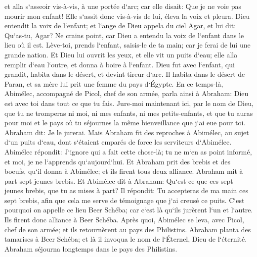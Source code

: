 \verse et alla s`asseoir vis-à-vis, à une portée d`arc; car elle disait: Que je ne voie pas mourir mon enfant! Elle s`assit donc vis-à-vis de lui, éleva la voix et pleura. 
\verse Dieu entendit la voix de l`enfant; et l`ange de Dieu appela du ciel Agar, et lui dit: Qu`as-tu, Agar? Ne crains point, car Dieu a entendu la voix de l`enfant dans le lieu où il est. 
\verse Lève-toi, prends l`enfant, saisis-le de ta main; car je ferai de lui une grande nation. 
\verse Et Dieu lui ouvrit les yeux, et elle vit un puits d`eau; elle alla remplir d`eau l`outre, et donna à boire à l`enfant. 
\verse Dieu fut avec l`enfant, qui grandit, habita dans le désert, et devint tireur d`arc. 
\verse Il habita dans le désert de Paran, et sa mère lui prit une femme du pays d`Égypte. 
\verse En ce temps-là, Abimélec, accompagné de Picol, chef de son armée, parla ainsi à Abraham: Dieu est avec toi dans tout ce que tu fais. 
\verse Jure-moi maintenant ici, par le nom de Dieu, que tu ne tromperas ni moi, ni mes enfants, ni mes petits-enfants, et que tu auras pour moi et le pays où tu séjournes la même bienveillance que j`ai eue pour toi. 
\verse Abraham dit: Je le jurerai. 
\verse Mais Abraham fit des reproches à Abimélec, au sujet d`un puits d`eau, dont s`étaient emparés de force les serviteurs d`Abimélec. 
\verse Abimélec répondit: J`ignore qui a fait cette chose-là; tu ne m`en as point informé, et moi, je ne l`apprends qu`aujourd`hui. 
\verse Et Abraham prit des brebis et des boeufs, qu`il donna à Abimélec; et ils firent tous deux alliance. 
\verse Abraham mit à part sept jeunes brebis. 
\verse Et Abimélec dit à Abraham: Qu`est-ce que ces sept jeunes brebis, que tu as mises à part? 
\verse Il répondit: Tu accepteras de ma main ces sept brebis, afin que cela me serve de témoignage que j`ai creusé ce puits. 
\verse C`est pourquoi on appelle ce lieu Beer Schéba; car c`est là qu`ils jurèrent l`un et l`autre. 
\verse Ils firent donc alliance à Beer Schéba. Après quoi, Abimélec se leva, avec Picol, chef de son armée; et ils retournèrent au pays des Philistins. 
\verse Abraham planta des tamariscs à Beer Schéba; et là il invoqua le nom de l`Éternel, Dieu de l`éternité. 
\verse Abraham séjourna longtemps dans le pays des Philistins. 

